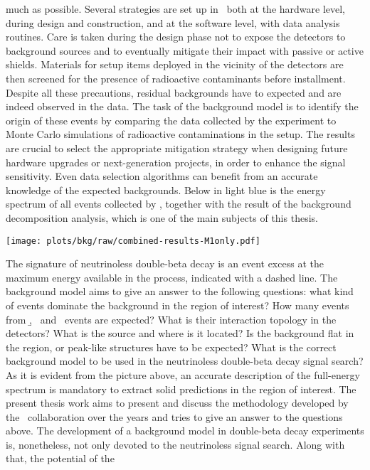much as possible. Several strategies are set up in \gerda\ both at the hardware level,
during design and construction, and at the software level, with data analysis routines.
Care is taken during the design phase not to expose the detectors to background sources
and to eventually mitigate their impact with passive or active shields. Materials for
setup items deployed in the vicinity of the detectors are then screened for the presence
of radioactive contaminants before installment. Despite all these precautions, residual
backgrounds have to expected and are indeed observed in the data. The task of the
background model is to identify the origin of these events by comparing the data collected
by the experiment to Monte Carlo simulations of radioactive contaminations in the setup.
The results are crucial to select the appropriate mitigation strategy when designing
future hardware upgrades or next-generation projects, in order to enhance the signal
sensitivity. Even data selection algorithms can benefit from an accurate knowledge of the
expected backgrounds.  Below in light blue is the energy spectrum of all events collected
by \gerda, together with the result of the background decomposition analysis, which is one
of the main subjects of this thesis.
\begin{center}
  \vspace{11pt}
  \texttt{[image: plots/bkg/raw/combined-results-M1only.pdf]}
\end{center}
The signature of neutrinoless double-beta decay is an event excess at the maximum energy
available in the process, indicated with a dashed line. The background model aims to give
an answer to the following questions: what kind of events dominate the background in the
region of interest? How many events from \b, \g\ and \a\ events are expected? What is
their interaction topology in the detectors? What is the source and where is it located?
Is the background flat in the region, or peak-like structures have to be expected?  What
is the correct background model to be used in the neutrinoless double-beta decay signal
search? As it is evident from the picture above, an accurate description of the
full-energy spectrum is mandatory to extract solid predictions in the region of interest.
The present thesis work aims to present and discuss the methodology developed by the
\gerda\ collaboration over the years and tries to give an answer to the questions above.
\newpar
The development of a background model in double-beta decay experiments is, nonetheless,
not only devoted to the neutrinoless signal search. Along with that, the potential of the
